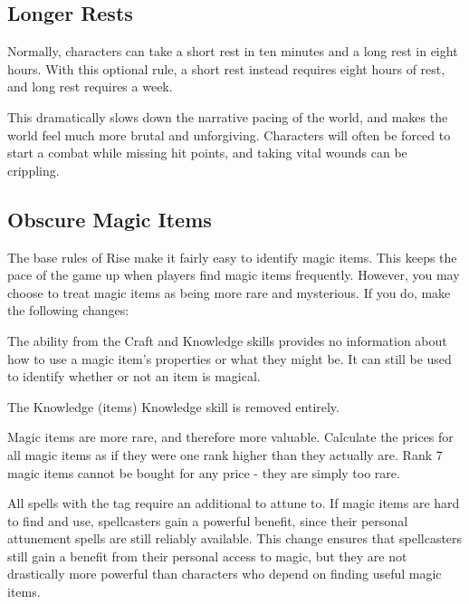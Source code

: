  \subsection{Longer Rests}\label{Longer Rests}
    Normally, characters can take a short rest in ten minutes and a long rest in eight hours.
    With this optional rule, a short rest instead requires eight hours of rest, and long rest requires a week.

    This dramatically slows down the narrative pacing of the world, and makes the world feel much more brutal and unforgiving.
    Characters will often be forced to start a combat while missing hit points, and taking vital wounds can be crippling.

  \subsection{Obscure Magic Items}\label{Obscure Magic Items}
    The base rules of Rise make it fairly easy to identify magic items.
    This keeps the pace of the game up when players find magic items frequently.
    However, you may choose to treat magic items as being more rare and mysterious.
    If you do, make the following changes:
    \begin{raggeditemize}
      \item The  ability from the Craft and Knowledge skills provides no information about how to use a magic item's properties or what they might be.
        It can still be used to identify whether or not an item is magical.
      \item The Knowledge (items) Knowledge skill is removed entirely.
      \item Magic items are more rare, and therefore more valuable.
        Calculate the prices for all magic items as if they were one rank higher than they actually are.
        Rank 7 magic items cannot be bought for any price - they are simply too rare.
      \item All spells with the  tag require an additional  to attune to.
        If magic items are hard to find and use, spellcasters gain a powerful benefit, since their personal attunement spells are still reliably available.
        This change ensures that spellcasters still gain a benefit from their personal access to magic, but they are not drastically more powerful than characters who depend on finding useful magic items.
    \end{raggeditemize}

